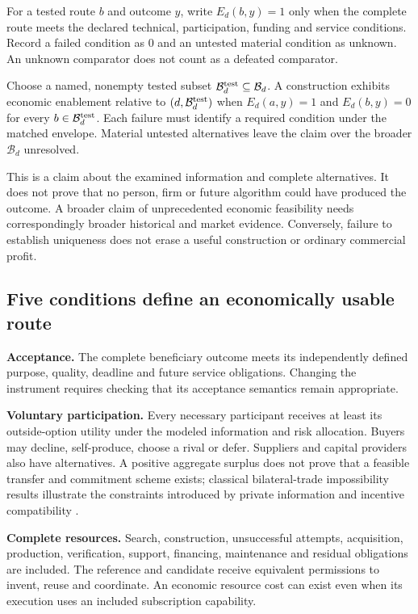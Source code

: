 \documentclass[11pt,letterpaper]{article}
\begin{document}
For a tested route $b$ and outcome $y$, write $E_d(b,y)=1$ only when the complete route meets the declared technical, participation, funding and service conditions. Record a failed condition as $0$ and an untested material condition as unknown. An unknown comparator does not count as a defeated comparator.

\begin{definition}
Choose a named, nonempty tested subset $\mathcal B_d^{\rm test}\subseteq\mathcal B_d$. A construction exhibits economic enablement relative to $(d,\mathcal B_d^{\rm test})$ when $E_d(a,y)=1$ and $E_d(b,y)=0$ for every $b\in\mathcal B_d^{\rm test}$. Each failure must identify a required condition under the matched envelope. Material untested alternatives leave the claim over the broader $\mathcal B_d$ unresolved.
\end{definition}
This is a claim about the examined information and complete alternatives. It does not prove that no person, firm or future algorithm could have produced the outcome. A broader claim of unprecedented economic feasibility needs correspondingly broader historical and market evidence. Conversely, failure to establish uniqueness does not erase a useful construction or ordinary commercial profit.

\subsection{Five conditions define an economically usable route}
\textbf{Acceptance.} The complete beneficiary outcome meets its independently defined purpose, quality, deadline and future service obligations. Changing the instrument requires checking that its acceptance semantics remain appropriate.

\textbf{Voluntary participation.} Every necessary participant receives at least its outside-option utility under the modeled information and risk allocation. Buyers may decline, self-produce, choose a rival or defer. Suppliers and capital providers also have alternatives. A positive aggregate surplus does not prove that a feasible transfer and commitment scheme exists; classical bilateral-trade impossibility results illustrate the constraints introduced by private information and incentive compatibility \cite{myerson}.

\textbf{Complete resources.} Search, construction, unsuccessful attempts, acquisition, production, verification, support, financing, maintenance and residual obligations are included. The reference and candidate receive equivalent permissions to invent, reuse and coordinate. An economic resource cost can exist even when its execution uses an included subscription capability.
\end{document}
